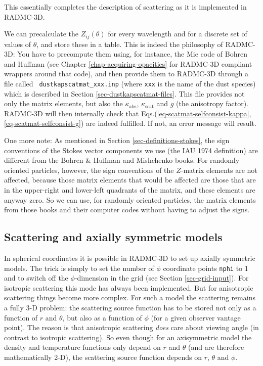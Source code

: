 \documentclass{report}
\begin{document}
This essentially completes the description of scattering as it is
implemented in RADMC-3D.

We can precalculate the $Z_{ij}(\theta)$ for every wavelength and for a
discrete set of values of $\theta$, and store these in a table. This is
indeed the philosophy of RADMC-3D: You have to precompute them using, for
instance, the Mie code of Bohren and Huffman (see Chapter
\ref{chap-acquiring-opacities} for RADMC-3D compliant wrappers around that
code), and then provide them to RADMC-3D through a file called {\small\tt
  dustkapscatmat\_xxx.inp} (where {\small\tt xxx} is the name of the dust
species) which is described in Section \ref{sec-dustkapscatmat-files}.  This
file provides not only the matrix elements, but also the
$\kappa_{\mathrm{abs}}$, $\kappa_{\mathrm{scat}}$ and $g$ (the anisotropy
factor). RADMC-3D will then internally check that
Eqs.(\ref{eq-scatmat-selfconsist-kappa}, \ref{eq-scatmat-selfconsist-g}) are
indeed fulfilled. If not, an error message will result.

One more note: As mentioned in Section \ref{sec-definitions-stokes}, the
sign conventions of the Stokes vector components we use (the IAU 1974
definition) are different from the Bohren \& Huffman and Mishchenko
books. For randomly oriented particles, however, the sign conventions of the
$Z$-matrix elements are not affected, because those matrix elements that
would be affected are those that are in the upper-right and lower-left
quadrants of the matrix, and these elements are anyway zero. So we can use,
for randomly oriented particles, the matrix elements from those books and
their computer codes without having to adjust the signs.

\subsection{Scattering and axially symmetric models}
In spherical coordinates it is possible in RADMC-3D to set up axially
symmetric models. The trick is simply to set the number of $\phi$ coordinate
points {\small\tt nphi} to 1 and to switch off the $\phi$-dimension in the
grid (see Section \ref{sec-grid-input}). For isotropic scattering this mode
has always been implemented. But for anisotropic scattering things become
more complex. For such a model the scattering remains a fully 3-D problem:
the scattering source function has to be stored not only as a function of
$r$ and $\theta$, but also as a function of $\phi$ (for a given observer
vantage point). The reason is that anisotropic scattering {\em does} care
about viewing angle (in contrast to isotropic scattering). So even though
for an axisymmetric model the density and temperature functions only depend
on $r$ and $\theta$ (and are therefore mathematically 2-D), the scattering
source function depends on $r$, $\theta$ and $\phi$.
\end{document}
